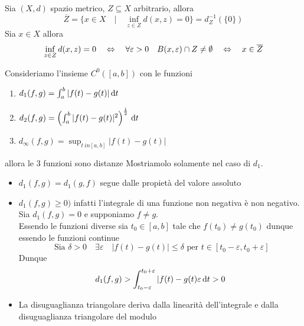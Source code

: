 \spazio
\begin{prop}Sia $(X,d)$ spazio metrico, $Z\subseteq X $ arbitrario, allora 
$$ \overline{Z}=\{ x\in X \quad \vert \quad \inf_{z\in Z } d(x,z)=0\} = d_Z^{-1}( \{ 0 \} )$$
Sia $x\in X$ allora
$$ \inf_{z\in Z} d(x,z)=0 \quad \Leftrightarrow \quad \forall \varepsilon>0 \quad B(x,\varepsilon) \cap Z \neq \emptyset \quad \Leftrightarrow \quad x\in \overline{Z}$$
\end{prop}
\newpage
\begin{prop}Consideriamo l'insieme $C^0 ( [a,b])$ con le funzioni
\begin{enumerate}
\item $d_1(f,g)= \int_{a}^b \vert f(t)-g(t) \vert \, \mathrm{d}t $
\item $d_2(f,g)=  \left( \int_{a}^b \vert f(t)-g(t) \vert ^2 \right)^{\frac{1}{2}}\, \mathrm{d}t $
\item $d_\infty(f,g)= \sup_{t\ in [a,b]} \vert f(t)-g(t) \vert  $
\end{enumerate}
allora le 3 funzioni sono distanze
\proof Mostriamolo solamente nel caso di $d_1$.\begin{itemize}
\item 
$d_1(f,g)= d_1(g,f)$  segue dalle propiet\`a del valore assoluto 
\item  $d_1(f,g)\geq 0)$ infatti l'integrale di una funzione non negativa \`e non negativo.\\
Sia $d_1(f,g)=0$ e supponiamo $f\neq g$.\\
Essendo le funzioni diverse sia $t_0\in [a,b]$ tale che $f(t_0)\neq g(t_0)$ dunque essendo le funzioni continue\\
$$ \text{ Sia } \delta>0 \quad \exists \varepsilon \quad \vert f(t)-g(t) \vert \leq \delta \text{ per } t \in [t_0-\varepsilon , t_0+\varepsilon]$$
Dunque
$$ d_1(f,g) > \int_{t_0-\varepsilon}^{t_0+\varepsilon} \vert f(t)-g(t)\varepsilon \, \mathrm{d}t >0 $$
\item La disuguaglianza triangolare deriva dalla linearit\`a dell'integrale e dalla disuguaglianza triangolare del modulo
\end{itemize}
\endproof
\end{prop}

